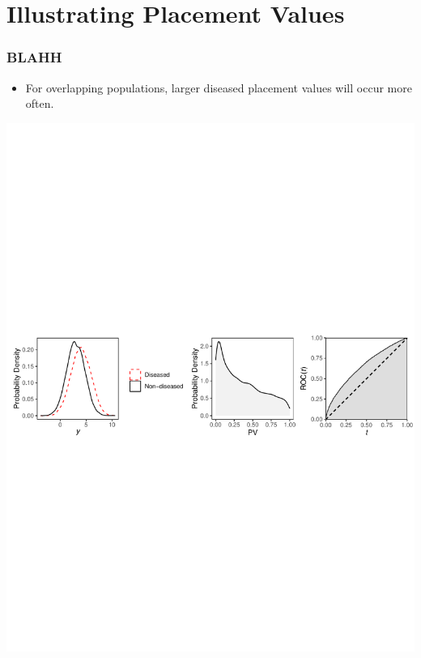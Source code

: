 \documentclass[t]{beamer}
\begin{document}
\section{Illustrating Placement Values}
\begin{frame}
\frametitle{BLAHH}
\begin{itemize}
\item For overlapping populations, larger diseased placement values will occur more often.
\end{itemize}
\begin{center}
\includegraphics[scale=0.55]{PVs_ROC_low}
\end{center}
\end{frame}

\end{document}
